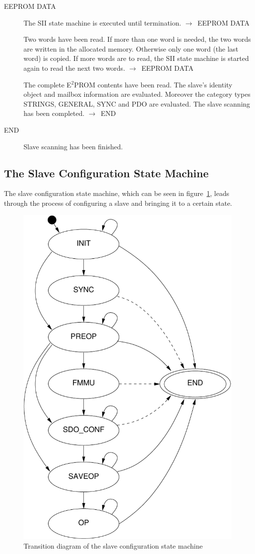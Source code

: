 \documentclass[a4paper,12pt,BCOR6mm,bibtotoc,idxtotoc]{scrbook}
\begin{document}
\begin{description}
\item[EEPROM DATA] The SII state machine is executed until
  termination. $\rightarrow$~EEPROM DATA

  Two words have been read. If more than one word is needed, the two
  words are written in the allocated memory. Otherwise only one word
  (the last word) is copied. If more words are to read, the SII state
  machine is started again to read the next two words.
  $\rightarrow$~EEPROM DATA

  The complete E$^2$PROM contents have been read. The slave's identity
  object and mailbox information are evaluated. Moreover the category
  types STRINGS, GENERAL, SYNC and PDO are evaluated. The slave
  scanning has been completed. $\rightarrow$~END

\item[END] Slave scanning has been finished.

\end{description}


\subsection{The Slave Configuration State Machine}
\label{sec:fsm-conf}

The slave configuration state machine, which can be seen in
figure~\ref{fig:fsm-slaveconf}, leads through the process of
configuring a slave and bringing it to a certain state.

\begin{figure}[htbp]
  \centering
  \includegraphics[width=.6\textwidth]{images/fsm-slaveconf}
  \caption{Transition diagram of the slave configuration state
    machine}
  \label{fig:fsm-slaveconf}
\end{figure}
\end{document}
